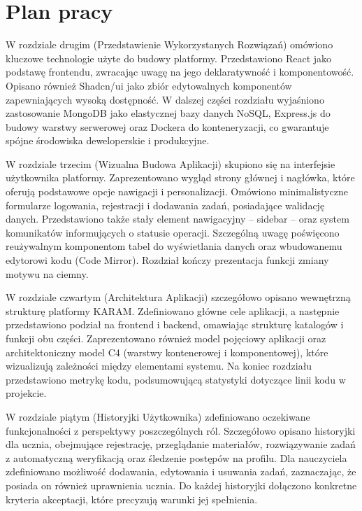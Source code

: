 \documentclass[shortabstract,inz]{iithesis}
\begin{document}
\section{Plan pracy}

W rozdziale drugim (Przedstawienie Wykorzystanych Rozwiązań) omówiono kluczowe technologie użyte do budowy platformy. Przedstawiono React jako podstawę frontendu, zwracając uwagę na jego deklaratywność i komponentowość. Opisano również Shadcn/ui jako zbiór edytowalnych komponentów zapewniających wysoką dostępność. W dalszej części rozdziału wyjaśniono zastosowanie MongoDB jako elastycznej bazy danych NoSQL, Express.js do budowy warstwy serwerowej oraz Dockera do konteneryzacji, co gwarantuje spójne środowiska deweloperskie i produkcyjne.

W rozdziale trzecim (Wizualna Budowa Aplikacji) skupiono się na interfejsie użytkownika platformy. Zaprezentowano wygląd strony głównej i nagłówka, które oferują podstawowe opcje nawigacji i personalizacji. Omówiono minimalistyczne formularze logowania, rejestracji i dodawania zadań, posiadające walidację danych. Przedstawiono także stały element nawigacyjny – sidebar – oraz system komunikatów informujących o statusie operacji. Szczególną uwagę poświęcono reużywalnym komponentom tabel do wyświetlania danych oraz wbudowanemu edytorowi kodu (Code Mirror). Rozdział kończy prezentacja funkcji zmiany motywu na ciemny.

W rozdziale czwartym (Architektura Aplikacji) szczegółowo opisano wewnętrzną strukturę platformy KARAM. Zdefiniowano główne cele aplikacji, a następnie przedstawiono podział na frontend i backend, omawiając strukturę katalogów i funkcji obu części. Zaprezentowano również model pojęciowy aplikacji oraz architektoniczny model C4 (warstwy kontenerowej i komponentowej), które wizualizują zależności między elementami systemu. Na koniec rozdziału przedstawiono metrykę kodu, podsumowującą statystyki dotyczące linii kodu w projekcie.

W rozdziale piątym (Historyjki Użytkownika) zdefiniowano oczekiwane funkcjonalności z perspektywy poszczególnych ról. Szczegółowo opisano historyjki dla ucznia, obejmujące rejestrację, przeglądanie materiałów, rozwiązywanie zadań z automatyczną weryfikacją oraz śledzenie postępów na profilu. Dla nauczyciela zdefiniowano możliwość dodawania, edytowania i usuwania zadań, zaznaczając, że posiada on również uprawnienia ucznia. Do każdej historyjki dołączono konkretne kryteria akceptacji, które precyzują warunki jej spełnienia.
\end{document}
